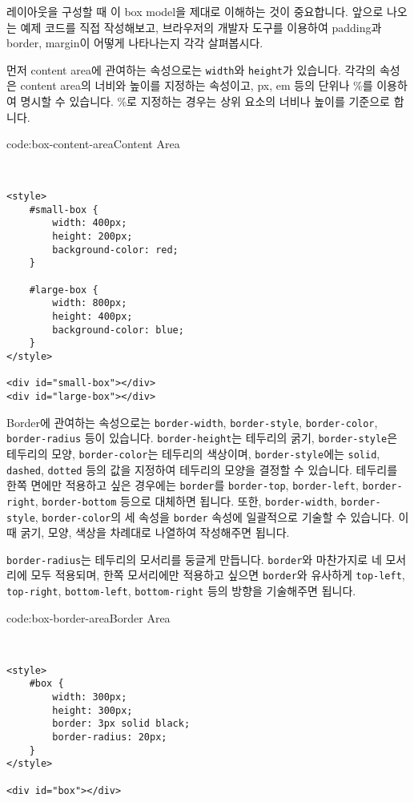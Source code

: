 
레이아웃을 구성할 때 이 box model을 제대로 이해하는 것이 중요합니다. 앞으로 나오는 예제 코드를 직접 작성해보고, 브라우저의 개발자 도구를 이용하여 padding과 border, margin이 어떻게 나타나는지 각각 살펴봅시다. 

먼저 content area에 관여하는 속성으로는 \texttt{width}와 \texttt{height}가 있습니다. 각각의 속성은 content area의 너비와 높이를 지정하는 속성이고, px, em 등의 단위나 \%를 이용하여 명시할 수 있습니다. \%로 지정하는 경우는 상위 요소의 너비나 높이를 기준으로 합니다. 

\begin{codeenv}{code:box-content-area}{Content Area}\begin{verbatim}


<style>
    #small-box {
        width: 400px;
        height: 200px;
        background-color: red;
    }

    #large-box {
        width: 800px;
        height: 400px;
        background-color: blue;
    }
</style>

<div id="small-box"></div>
<div id="large-box"></div>
\end{verbatim}
\end{codeenv}

Border에 관여하는 속성으로는 \texttt{border-width}, \texttt{border-style}, \texttt{border-color}, \texttt{border-radius} 등이 있습니다. \texttt{border-height}는 테두리의 굵기, \texttt{border-style}은 테두리의 모양, \texttt{border-color}는 테두리의 색상이며, \texttt{border-style}에는 \texttt{solid}, \texttt{dashed}, \texttt{dotted} 등의 값을 지정하여 테두리의 모양을 결정할 수 있습니다. 테두리를 한쪽 면에만 적용하고 싶은 경우에는 \texttt{border}를 \texttt{border-top}, \texttt{border-left}, \texttt{border-right}, \texttt{border-bottom} 등으로 대체하면 됩니다. 또한, \texttt{border-width}, \texttt{border-style}, \texttt{border-color}의 세 속성을 \texttt{border} 속성에 일괄적으로 기술할 수 있습니다. 이때 굵기, 모양, 색상을 차례대로 나열하여 작성해주면 됩니다. 

\texttt{border-radius}는 테두리의 모서리를 둥글게 만듭니다. \texttt{border}와 마찬가지로 네 모서리에 모두 적용되며, 한쪽 모서리에만 적용하고 싶으면 \texttt{border}와 유사하게 \texttt{top-left}, \texttt{top-right}, \texttt{bottom-left}, \texttt{bottom-right} 등의 방향을 기술해주면 됩니다. 

\begin{codeenv}{code:box-border-area}{Border Area}\begin{verbatim}


<style>
    #box {
        width: 300px;
        height: 300px;
        border: 3px solid black;
        border-radius: 20px;
    }
</style>

<div id="box"></div>
\end{verbatim}
\end{codeenv}

